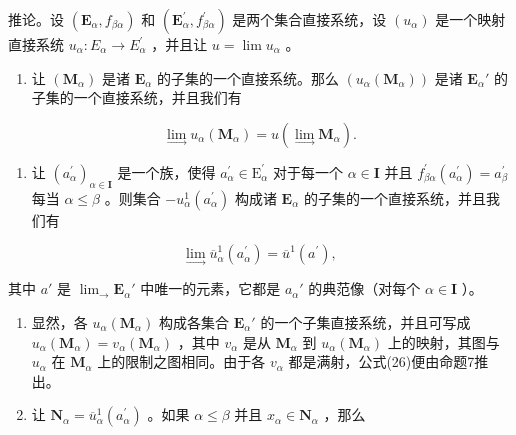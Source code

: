 推论。设 \((\mathbf{E}_{\alpha}, f_{\beta\alpha})\) 和 \((\mathbf{E}_{\alpha}^{\prime}, f_{\beta\alpha}^{\prime})\) 是两个集合直接系统，设 \((u_{\alpha})\) 是一个映射直接系统 \(u_{\alpha}: E_{\alpha} \to E_{\alpha}^{\prime}\) ，并且让 \(u = \lim u_{\alpha}\) 。

\begin{enumerate}
\def\labelenumi{(\roman{enumi})}
\tightlist
\item
  让 \((\mathbf{M}_{\alpha})\) 是诸 \(\mathbf{E}_{\alpha}\) 的子集的一个直接系统。那么 \((u_{\alpha}(\mathbf{M}_{\alpha}))\) 是诸 \(\mathbf{E}_{\alpha}'\) 的子集的一个直接系统，并且我们有
\end{enumerate}

\[
\lim _ {\rightarrow} u _ {\alpha} (\mathbf {M} _ {\alpha}) = u (\lim _ {\rightarrow} \mathbf {M} _ {\alpha}).\tag{26}
\]

\begin{enumerate}
\def\labelenumi{(\roman{enumi})}
\setcounter{enumi}{1}
\tightlist
\item
  让 \((a_{\alpha}^{\prime})_{\alpha \in \mathbf{I}}\) 是一个族，使得 \(a_{\alpha}^{\prime} \in \mathrm{E}_{\alpha}^{\prime}\) 对于每一个 \(\alpha \in \mathbf{I}\) 并且 \(f_{\beta \alpha}^{\prime}(a_{\alpha}^{\prime}) = a_{\beta}^{\prime}\) 每当 \(\alpha \leqslant \beta\) 。则集合 \(-u_{\alpha}^{1}(a_{\alpha}^{\prime})\) 构成诸 \(\mathbf{E}_{\alpha}\) 的子集的一个直接系统，并且我们有
\end{enumerate}

\[
\lim _ {\rightarrow} \overline {{{u}}} _ {\alpha} ^ {1} (a _ {\alpha} ^ {\prime}) = \overline {{{u}}} ^ {1} (a ^ {\prime}),\tag{27}
\]

其中 \(a'\) 是 \(\lim_{\rightarrow} \mathbf{E}_{\alpha}'\) 中唯一的元素，它都是 \(a_{\alpha}'\) 的典范像（对每个 \(\alpha \in \mathbf{I}\) ）。

\begin{enumerate}
\def\labelenumi{(\roman{enumi})}
\item
  显然，各 \(u_{\alpha}(\mathbf{M}_{\alpha})\) 构成各集合 \(\mathbf{E}_{\alpha}'\) 的一个子集直接系统，并且可写成 \(u_{\alpha}(\mathbf{M}_{\alpha}) = v_{\alpha}(\mathbf{M}_{\alpha})\) ，其中 \(v_{\alpha}\) 是从 \(\mathbf{M}_{\alpha}\) 到 \(u_{\alpha}(\mathbf{M}_{\alpha})\) 上的映射，其图与 \(u_{\alpha}\) 在 \(\mathbf{M}_{\alpha}\) 上的限制之图相同。由于各 \(v_{\alpha}\) 都是满射，公式(26)便由命题7推出。
\item
  让 \(\mathbf{N}_{\alpha} = \overline{u}_{\alpha}^{1}(a_{\alpha}^{\prime})\) 。如果 \(\alpha \leqslant \beta\) 并且 \(x_{\alpha} \in \mathbf{N}_{\alpha}\) ，那么
\end{enumerate}

